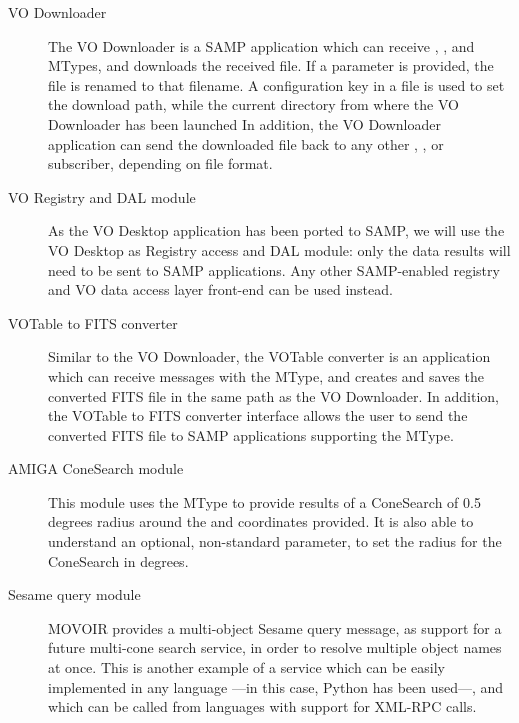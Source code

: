 		\begin{description}
			\item[VO Downloader] The VO Downloader is a SAMP
			application which can receive
			, ,
			and  MTypes, and downloads the
			received file. If a  parameter is
			provided, the file is renamed to that filename. A
			 configuration
			key in a  file is used to set the
			download path, while the current directory from where
			the VO Downloader has been launched In addition, the VO
			Downloader application can send the downloaded file
			back to any other ,
			, or 
			subscriber, depending on file format.
			
			\item[VO Registry and DAL module] As the VO Desktop
			application has been ported to SAMP, we will use the
			VO Desktop as Registry access and DAL module: only
			the data results will need to be sent to SAMP
			applications. Any other SAMP-enabled registry and
			VO data access layer front-end can be used instead.
			
			\item[VOTable to FITS converter] Similar to the VO
			Downloader, the VOTable converter is an application
			which can receive messages with the
			 MType, and creates and
			saves the converted FITS file in the same path as the
			VO Downloader. In addition, the VOTable to FITS
			converter interface allows the user to send the
			converted FITS file to SAMP applications supporting the
			 MType.
			
			\item[AMIGA ConeSearch module] This module uses the
			 MType to provide results
			of a ConeSearch of 0.5 degrees radius around the
			 and  coordinates provided.
			It is also able to understand an optional,
			non-standard  parameter, to set the
			radius for the ConeSearch in degrees.
			
			\item[Sesame query module] MOVOIR provides a
			multi-object Sesame query message, as support for
			a future multi-cone search service, in order to
			resolve multiple object names at once. This is
			another example of a service which can be easily
			implemented in any language ---in this case,
			Python has been used---, and which can be called from
			languages with support for XML-RPC calls.
		\end{description}
		
